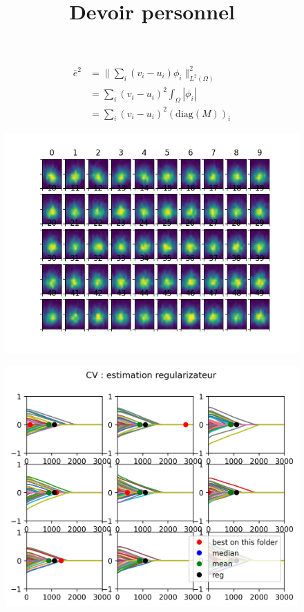 \documentclass{article}
\date{}
\date{}
\title{Devoir personnel}
\begin{document}
\maketitle
\section{}%
\begin{equation}
\begin{aligned}
\bar{e}^2 &= \|\sum_i (v_i-u_i)\phi_i\|_{L^2(\Omega)}^2\\
&= \sum_i(v_i-u_i)^2 \int_{\Omega}|\phi_i|\\
&= \sum_i (v_i - u_i )^2 (\text{diag}(M))_i
\end{aligned}
\end{equation}

\begin{figure}
\includegraphics[scale=1]{visu_feature.png}

\end{figure}

\newpage
\begin{figure}
\includegraphics[scale=1]{cv_reg.png}

\end{figure}
\end{document}
